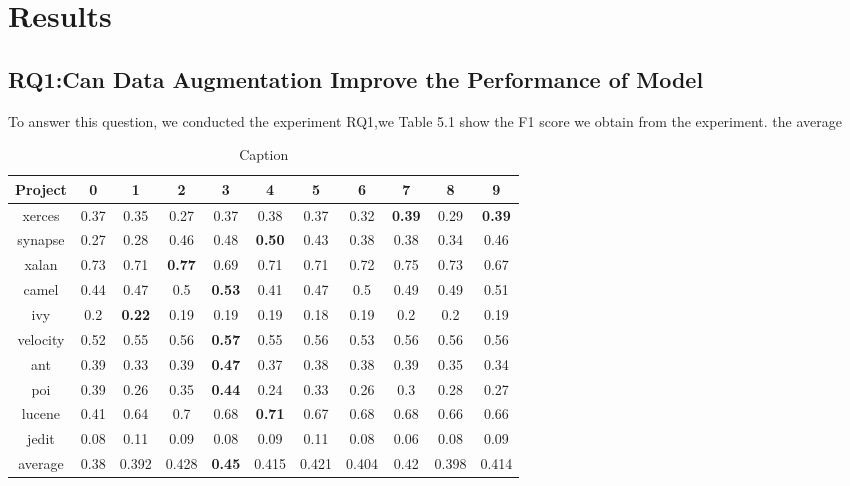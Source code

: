 \chapter{Results}
\section{RQ1:Can Data Augmentation Improve the Performance of Model}
To answer this question, we conducted the experiment RQ1,we Table 5.1 show the F1 score  we obtain from the experiment. the average 

\begin{table}[]
    \centering
    \begin{tabular}{c|c|c|c|c|c|c|c|c|c|c}
    \toprule[2pt]
         Project & 0 & 1 & 2 & 3 & 4 & 5 & 6 & 7 & 8 & 9 \\
    \toprule[1pt]
         xerces & 0.37 & 0.35 & 0.27 & 0.37 & 0.38 & 0.37 & 0.32 & \textbf{0.39} & 0.29 & \textbf{0.39} \\
         synapse & 0.27 & 0.28 & 0.46 & 0.48 & \textbf{0.50} & 0.43 & 0.38 & 0.38 & 0.34 & 0.46 \\
         xalan & 0.73 & 0.71 & \textbf{0.77} & 0.69 & 0.71 & 0.71 & 0.72 & 0.75 & 0.73 &  0.67 \\
         camel & 0.44 & 0.47 & 0.5 & \textbf{0.53} & 0.41 & 0.47 & 0.5 & 0.49 & 0.49 &  0.51 \\
         ivy & 0.2 & \textbf{0.22} & 0.19 & 0.19 & 0.19 & 0.18 & 0.19 & 0.2 & 0.2 & 0.19 \\
         velocity & 0.52 & 0.55 & 0.56 & \textbf{0.57} & 0.55 & 0.56 & 0.53 & 0.56 & 0.56 & 0.56 \\
         ant & 0.39 & 0.33 & 0.39 & \textbf{0.47} & 0.37 & 0.38 & 0.38 & 0.39 & 0.35 & 0.34 \\
         poi & 0.39 & 0.26 & 0.35 & \textbf{0.44} & 0.24 & 0.33 & 0.26 & 0.3 & 0.28 & 0.27 \\
         lucene & 0.41 & 0.64 & 0.7 & 0.68 & \textbf{0.71} & 0.67 & 0.68 & 0.68 & 0.66 & 0.66 \\
         jedit & 0.08 & 0.11 & 0.09 & 0.08 & 0.09 & 0.11 & 0.08 & 0.06 & 0.08 & 0.09 \\
         average & 0.38 & 0.392 & 0.428 & \textbf{0.45} & 0.415 & 0.421 & 0.404 & 0.42 & 0.398 & 0.414 \\
         \toprule[2pt]
    \end{tabular}
    \caption{Caption}
    \label{tab:my_label}
\end{table}

